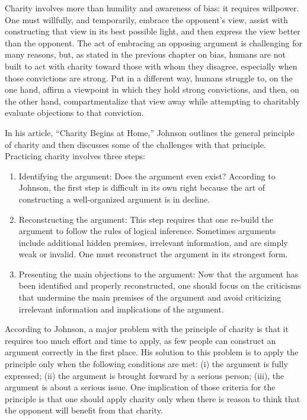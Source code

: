 \documentclass[
]{book}
\providecommand{\tightlist}{%
  \setlength{\itemsep}{0pt}\setlength{\parskip}{0pt}}
\begin{document}
Charity involves more than humility and awareness of bias: it requires willpower. One must willfully, and temporarily, embrace the opponent's view, assist with constructing that view in its best possible light, and then express the view better than the opponent. The act of embracing an opposing argument is challenging for many reasons, but, as stated in the previous chapter on bias, humans are not built to act with charity toward those with whom they disagree, especially when those convictions are strong. Put in a different way, humans struggle to, on the one hand, affirm a viewpoint in which they hold strong convictions, and then, on the other hand, compartmentalize that view away while attempting to charitably evaluate objections to that conviction.

In his article, ``Charity Begins at Home,'' Johnson outlines the general principle of charity and then discusses some of the challenges with that principle. Practicing charity involves three steps:

\begin{enumerate}
\def\labelenumi{\arabic{enumi}.}
\tightlist
\item
  Identifying the argument: Does the argument even exist? According to Johnson, the first step is difficult in its own right because the art of constructing a well-organized argument is in decline.
\item
  Reconstructing the argument: This step requires that one re-build the argument to follow the rules of logical inference. Sometimes arguments include additional hidden premises, irrelevant information, and are simply weak or invalid. One must reconstruct the argument in its strongest form.
\item
  Presenting the main objections to the argument: Now that the argument has been identified and properly reconstructed, one should focus on the criticisms that undermine the main premises of the argument and avoid criticizing irrelevant information and implications of the argument.
\end{enumerate}

According to Johnson, a major problem with the principle of charity is that it requires too much effort and time to apply, as few people can construct an argument correctly in the first place. His solution to this problem is to apply the principle only when the following conditions are met: (i) the argument is fully expressed; (ii) the argument is brought forward by a serious person; (iii), the argument is about a serious issue. One implication of those criteria for the principle is that one should apply charity only when there is reason to think that the opponent will benefit from that charity.
\end{document}
